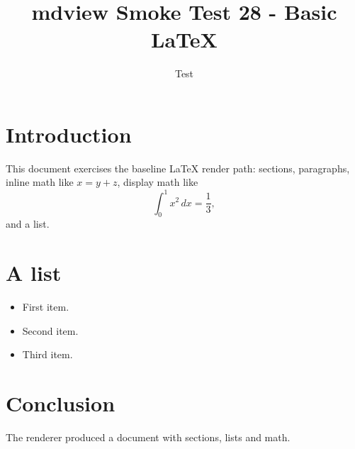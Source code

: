 \documentclass{article}
\title{mdview Smoke Test 28 - Basic LaTeX}
\author{Test}
\begin{document}
\maketitle

\section{Introduction}
This document exercises the baseline LaTeX render path:
sections, paragraphs, inline math like $x = y + z$, display
math like
\[
    \int_0^1 x^2 \, dx = \frac{1}{3},
\]
and a list.

\section{A list}
\begin{itemize}
    \item First item.
    \item Second item.
    \item Third item.
\end{itemize}

\section{Conclusion}
The renderer produced a document with sections, lists and math.
\end{document}
